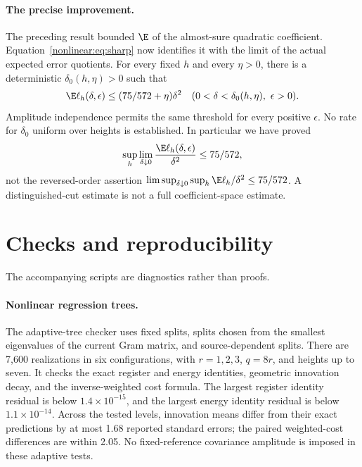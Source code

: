 \documentclass[11pt,oneside,openany,a4paper]{book}
\numberwithin{equation}{chapter}
\theoremstyle{definition}
\theoremstyle{remark}
\begin{document}
\paragraph{The precise improvement.}
The preceding result bounded $\E$ of the almost-sure quadratic coefficient. Equation~\eqref{nonlinear:eq:sharp} now identifies it with the limit of the actual expected error quotients. For every fixed $h$ and every $\eta>0$, there is a deterministic $\delta_0(h,\eta)>0$ such that
\[
 \E\ell_h(\delta,\epsilon)\le(75/572+\eta)\delta^2
 \quad(0<\delta<\delta_0(h,\eta),\ \epsilon>0).
\]
Amplitude independence permits the same threshold for every positive $\epsilon$. No rate for $\delta_0$ uniform over heights is established. In particular we have proved
\[
 \sup_h\lim_{\delta\downarrow0}\frac{\E\ell_h(\delta,\epsilon)}{\delta^2}\le75/572,
\]
not the reversed-order assertion $\limsup_{\delta\downarrow0}\sup_h\E\ell_h/\delta^2\le75/572$. A distinguished-cut estimate is not a full coefficient-space estimate.

\section{Checks and reproducibility}
The accompanying scripts are diagnostics rather than proofs.

\paragraph{Nonlinear regression trees.}
The adaptive-tree checker uses fixed splits, splits chosen from the smallest eigenvalues of the current Gram matrix, and source-dependent splits. There are 7,600 realizations in six configurations, with $r=1,2,3$, $q=8r$, and heights up to seven. It checks the exact register and energy identities, geometric innovation decay, and the inverse-weighted cost formula. The largest register identity residual is below $1.4\times10^{-15}$, and the largest energy identity residual is below $1.1\times10^{-14}$. Across the tested levels, innovation means differ from their exact predictions by at most 1.68 reported standard errors; the paired weighted-cost differences are within 2.05. No fixed-reference covariance amplitude is imposed in these adaptive tests.
\end{document}

